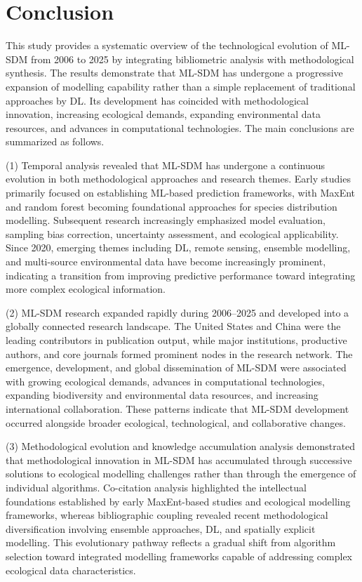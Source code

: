 \documentclass[authoryear,preprint,review,12pt]{elsarticle}
\begin{document}
\section{Conclusion}

This study provides a systematic overview of the technological evolution of ML-SDM from 2006 to 2025 by integrating bibliometric analysis with methodological synthesis. The results demonstrate that ML-SDM has undergone a progressive expansion of modelling capability rather than a simple replacement of traditional approaches by DL. Its development has coincided with methodological innovation, increasing ecological demands, expanding environmental data resources, and advances in computational technologies. The main conclusions are summarized as follows.

(1) Temporal analysis revealed that ML-SDM has undergone a continuous evolution in both methodological approaches and research themes. Early studies primarily focused on establishing ML-based prediction frameworks, with MaxEnt and random forest becoming foundational approaches for species distribution modelling. Subsequent research increasingly emphasized model evaluation, sampling bias correction, uncertainty assessment, and ecological applicability. Since 2020, emerging themes including DL, remote sensing, ensemble modelling, and multi-source environmental data have become increasingly prominent, indicating a transition from improving predictive performance toward integrating more complex ecological information.

(2) ML-SDM research expanded rapidly during 2006–2025 and developed into a globally connected research landscape. The United States and China were the leading contributors in publication output, while major institutions, productive authors, and core journals formed prominent nodes in the research network. The emergence, development, and global dissemination of ML-SDM were associated with growing ecological demands, advances in computational technologies, expanding biodiversity and environmental data resources, and increasing international collaboration. These patterns indicate that ML-SDM development occurred alongside broader ecological, technological, and collaborative changes.

(3) Methodological evolution and knowledge accumulation analysis demonstrated that methodological innovation in ML-SDM has accumulated through successive solutions to ecological modelling challenges rather than through the emergence of individual algorithms. Co-citation analysis highlighted the intellectual foundations established by early MaxEnt-based studies and ecological modelling frameworks, whereas bibliographic coupling revealed recent methodological diversification involving ensemble approaches, DL, and spatially explicit modelling. This evolutionary pathway reflects a gradual shift from algorithm selection toward integrated modelling frameworks capable of addressing complex ecological data characteristics.
\end{document}
